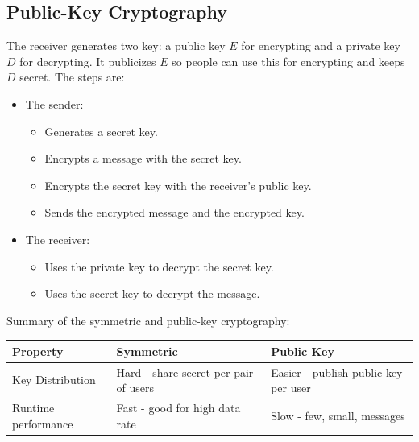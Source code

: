 \documentclass[twoside]{article}
\begin{document}
\subsection{Public-Key Cryptography}
The receiver generates two key: a public key \(E\) for encrypting and a private
key \(D\) for decrypting. It publicizes \(E\) so people can use this for
encrypting and keeps \(D\) secret. The steps are:
\begin{itemize}
    \item The sender:
    \begin{itemize}
        \item Generates a secret key.
        \item Encrypts a message with the secret key.
        \item Encrypts the secret key with the receiver's public key.
        \item Sends the encrypted message and the encrypted key.
    \end{itemize}
    \item The receiver:
    \begin{itemize}
        \item Uses the private key to decrypt the secret key.
        \item Uses the secret key to decrypt the message.
    \end{itemize}
\end{itemize}
Summary of the symmetric and public-key cryptography:
\begin{center}
    \begin{tabular}{| l | l | l |}
    \hline \textbf{Property} & \textbf{Symmetric} & \textbf{Public Key} \\ \hline
    \hline Key Distribution & Hard - share secret per pair of users & Easier - publish public key per user \\ \hline
    \hline Runtime performance & Fast - good for high data rate & Slow - few, small, messages \\ \hline
    \end{tabular}
\end{center}
\end{document}
